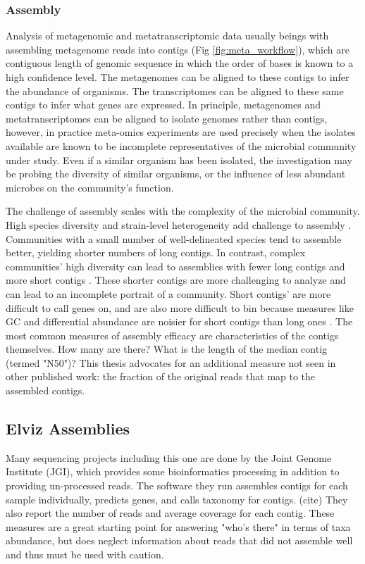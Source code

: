 \subsubsection{Assembly}
Analysis of metagenomic and metatranscriptomic data usually beings with assembling metagenome reads into contigs (Fig \ref{fig:meta_workflow}), which are contiguous length of genomic sequence in which the order of bases is known to a high confidence level. %
The metagenomes can be aligned to these contigs to infer the abundance of organisms.
The transcriptomes can be aligned to these same contigs to infer what genes are expressed.
In principle, metagenomes and metatranscriptomes can be aligned to isolate genomes rather than contigs, however, in practice meta-omics experiments are used precisely when the isolates available are known to be incomplete representatives of the microbial community under study.
Even if a similar organism has been isolated, the investigation may be probing the diversity of similar organisms, or the influence of less abundant microbes on the community's function.

The challenge of assembly scales with the complexity of the microbial community.
High species diversity and strain-level heterogeneity add challenge to assembly \cite{kunin2008, thomas2012}.
Communities with a small number of well-delineated species tend to assemble better, yielding shorter numbers of long contigs.
In contrast, complex communities' high diversity can lead to assemblies with fewer long contigs and more short contigs \cite{kunin2008}.
These shorter contigs are more challenging to analyze and can lead to an incomplete portrait of a community.
Short contigs' are more difficult to call genes on, and are also more difficult to bin because measures like GC and differential abundance are noisier for short contigs than long ones \cite{sangwan2016}.
The most common measures of assembly efficacy are characteristics of the contigs themselves.  How many are there?  What is the length of the median contig (termed "N50")?
This thesis advocates for an additional measure not seen in other published work: the fraction of the original reads that map to the assembled contigs.   %

\subsection{Elviz Assemblies}
Many sequencing projects including this one are done by the Joint Genome Institute (JGI), which provides some bioinformatics processing in addition to providing un-processed reads.
The software they run assembles contigs for each sample individually, predicts genes, and calls taxonomy for contigs. (cite)
They also report the number of reads and average coverage for each contig.
These measures are a great starting point for answering "who's there" in terms of taxa abundance, but does neglect information about reads that did not assemble well and thus must be used with caution.

